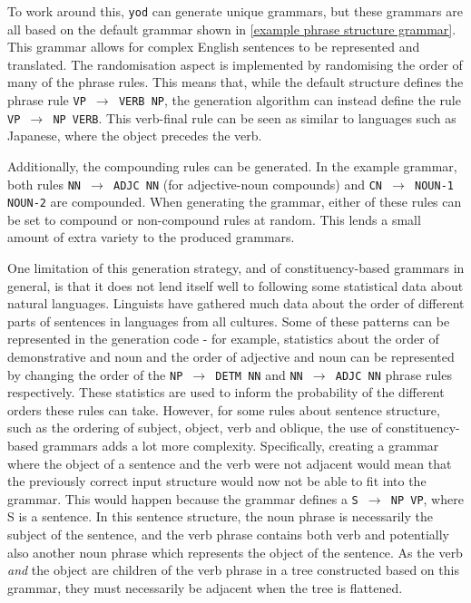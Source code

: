 \documentclass{report}
\begin{document}
	To work around this, \texttt{yod} can generate unique grammars, but these grammars are all based on the default grammar shown in \ref{example phrase structure grammar}. This grammar allows for complex English sentences to be represented and translated. The randomisation aspect is implemented by randomising the order of many of the phrase rules. This means that, while the default structure defines the phrase rule \texttt{VP $\rightarrow$ VERB NP}, the generation algorithm can instead define the rule \texttt{VP $\rightarrow$ NP VERB}. This verb-final rule can be seen as similar to languages such as Japanese, where the object precedes the verb.
	
	Additionally, the compounding rules can be generated. In the example grammar, both rules \texttt{NN $\rightarrow$ ADJC NN} (for adjective-noun compounds) and \texttt{CN $\rightarrow$ NOUN-1 NOUN-2} are compounded. When generating the grammar, either of these rules can be set to compound or non-compound rules at random. This lends a small amount of extra variety to the produced grammars.
	
	One limitation of this generation strategy, and of constituency-based grammars in general, is that it does not lend itself well to following some statistical data about natural languages. Linguists have gathered much data about the order of different parts of sentences in languages from all cultures\cite{wals-81}. Some of these patterns can be represented in the generation code - for example, statistics about the order of demonstrative and noun\cite{wals-88} and the order of adjective and noun\cite{wals-87} can be represented by changing the order of the \texttt{NP $\rightarrow$ DETM NN} and \texttt{NN $\rightarrow$ ADJC NN} phrase rules respectively. These statistics are used to inform the probability of the different orders these rules can take. However, for some rules about sentence structure, such as the ordering of subject, object, verb and oblique\cite{wals-84}, the use of constituency-based grammars adds a lot more complexity. Specifically, creating a grammar where the object of a sentence and the verb were not adjacent would mean that the previously correct input structure would now not be able to fit into the grammar. This would happen because the grammar defines a \texttt{S $\rightarrow$ NP VP}, where S is a sentence. In this sentence structure, the noun phrase is necessarily the subject of the sentence, and the verb phrase contains both verb and potentially also another noun phrase which represents the object of the sentence. As the verb \textit{and} the object are children of the verb phrase in a tree constructed based on this grammar, they must necessarily be adjacent when the tree is flattened.
	
\end{document}
